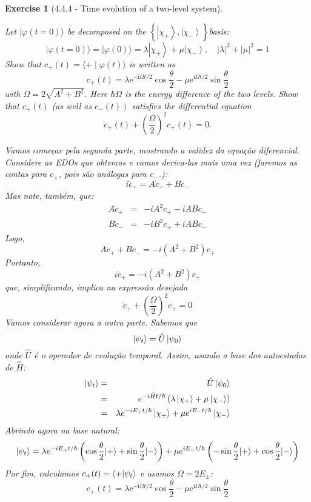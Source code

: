 \documentclass[12pt]{article}
\def\be{\begin{equation}}
\def\ee{\end{equation}}
\def\bea{\begin{eqnarray*}}
\def\eea{\end{eqnarray*}}
\def\f{\frac}
\def\l{\left}
\def\r{\right}
\newtheorem{exercise}{Exercise}
\begin{document}
\begin{exercise}[4.4.4 - Time evolution of a two-level system]
\begin{exercises}
		\item Let $|\varphi(t=0)\rangle$ be decomposed on the $\left\{\left|\chi_{+}\right\rangle,\left|\chi_{-}\right\rangle\right\}$basis:
		$$
		|\varphi(t=0)\rangle=|\varphi(0)\rangle=\lambda\left|\chi_{+}\right\rangle+\mu\left|\chi_{-}\right\rangle, \quad|\lambda|^{2}+|\mu|^{2}=1
		$$
		Show that $c_{+}(t)=\langle+\mid \varphi(t)\rangle$ is written as
		$$
		c_{+}(t)=\lambda \mathrm{e}^{-\mathrm{i} \Omega t / 2} \cos \frac{\theta}{2}-\mu \mathrm{e}^{\mathrm{i} \Omega t / 2} \sin \frac{\theta}{2}
		$$
		with $\Omega=2 \sqrt{A^{2}+B^{2}}$. Here $\hbar \Omega$ is the energy difference of the two levels. Show that $c_{+}(t)$ (as well as $\left.c_{-}(t)\right)$ satisfies the differential equation
		$$
		\ddot{c}_{+}(t)+\left(\frac{\Omega}{2}\right)^{2} c_{+}(t)=0 .
		$$
		\begin{multianswer}
			Vamos começar pela segunda parte, mostrando a validez da equação diferencial. Considere as EDOs que obtemos e vamos deriva-las mais uma vez (faremos as contas para $c_+$, pois são análogas para $c_-$.):
			\be
				i\ddot{c}_+ = A\dot{c}_+ + B\dot{c}_-
			\ee
			Mas note, também, que:
			\bea
				A\dot{c}_+ &=& -iA^2c_+ - iABc_- \\
				B\dot{c}_- &=& -iB^2c_+ + iABc_-
			\eea
			Logo, 
			\be
				A\dot{c}_+ + B\dot{c}_- = -i(A^2+B^2)c_+
			\ee
			Portanto,
			\be
				i\ddot{c}_+ = -i(A^2+B^2)c_+
			\ee
			que, simplificando, implica na expressão desejada
			\be
				\ddot{c}_+ +\l(\f{\Omega}{2}\r)^2c_+ = 0
			\ee
			Vamos considerar agora a outra parte. Sabemos que
			\be
				\ket{\psi_t} = \hat{U}\ket{\psi_0}
			\ee
			onde $\hat{U}$ é o operador de evolução temporal. Assim, usando a base dos autoestados de $\hat{H}$:
			\bea
				\ket{\psi_t} &=& \hat{U}\ket{\psi_0} \\
							&=& e^{-i\hat{H}t/\hbar} \l(\lambda\left|\chi_{+}\right\rangle+\mu\left|\chi_{-}\right\rangle\r) \\
							&=& \lambda e^{-iE_+t/\hbar}\ket{\chi_+} + \mu e^{iE_-t/\hbar}\ket{\chi_-}
			\eea
			Abrindo agora na base natural:
			\be
				\ket{\psi_t} = \lambda e^{-iE_+t/\hbar}\l(\cos \frac{\theta}{2}|+\rangle+\sin \frac{\theta}{2}|-\rangle\r) + \mu e^{iE_-t/\hbar}\l(-\sin \frac{\theta}{2}|+\rangle+\cos \frac{\theta}{2}|-\rangle\r)
			\ee
			Por fim, calculamos $c_+(t) = \braket{+|\psi_t}$ e usamos $\Omega = 2E_\pm$:
			\be
				c_+(t) = \lambda \mathrm{e}^{-\mathrm{i} \Omega t / 2} \cos \frac{\theta}{2}-\mu \mathrm{e}^{\mathrm{i} \Omega t / 2} \sin \frac{\theta}{2}
			\ee
			

\end{multianswer}
\end{exercises}
\end{exercise}
\end{document}
